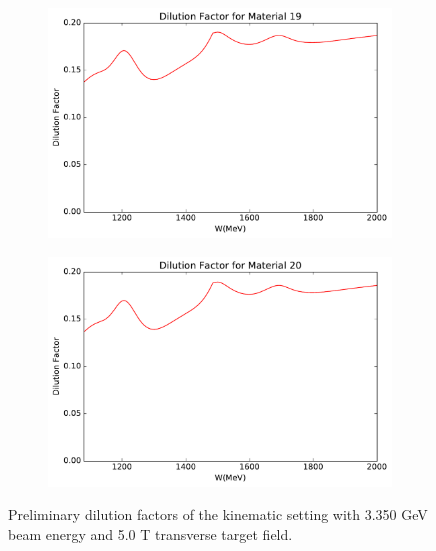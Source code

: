 \begin{figure}[p!]
  \centering
  \begin{subfigure}[t]{0.49\textwidth}
    \includegraphics[width=\textwidth]{figs/dilution-33505090-19.pdf}
  \end{subfigure}
  \begin{subfigure}[t]{0.49\textwidth}
    \includegraphics[width=\textwidth]{figs/dilution-33505090-20.pdf}
  \end{subfigure}
  \caption[Dilution factors with $E=3.350$ GeV and $B=2.5$ T.]{Preliminary dilution factors of the kinematic setting with 3.350 GeV beam energy and 5.0 T transverse target field. \label{C7S4F6}}
\end{figure}

